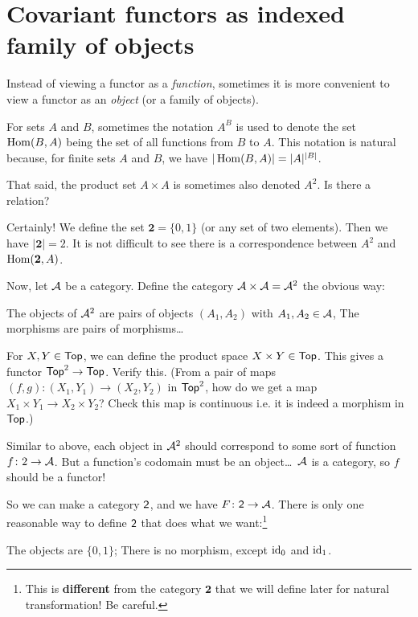 \section{Covariant functors as indexed family of objects}

Instead of viewing a functor as a \emph{function}, sometimes it is more convenient to view a functor
as an \emph{object} (or a family of objects).

For sets $A$ and $B$, sometimes the notation $A^B$ is used to denote the set $\Hom(B, A)$ being the
set of all functions from $B$ to $A$.
This notation is natural because, for finite sets $A$ and $B$, we have $|\Hom(B, A)|=|A|^{|B|}$.

That said, the product set $A \times A$ is sometimes also denoted $A^2$. Is there a relation?

Certainly! We define the set $\textbf{2} = \{ 0, 1 \}$ (or any set of two elements).
Then we have $|\textbf{2}|=2$. It is not difficult to see there is a correspondence between $A^2$
and $\Hom(\textbf{2}, A)$.

Now, let $\AA$ be a category. Define the category $\AA \times \AA = \mathcal
A^2$ the obvious way:
\begin{itemize}
	\ii The objects of $\AA^2$ are pairs of objects $(A_1, A_2)$ with
	$A_1, A_2 \in \AA$,
	\ii The morphisms are pairs of morphisms\dots
\end{itemize}
\begin{exercise}
	For $X, Y \in \catname{Top}$, we can define the product space $X \times Y \in \catname{Top}$.
	This gives a functor $\catname{Top}^2 \to \catname{Top}$. Verify this.
	(From a pair of maps $(f, g): (X_1, Y_1) \to (X_2, Y_2)$ in $\catname{Top}^2$,
	how do we get a map $X_1 \times Y_1 \to X_2 \times Y_2$? Check this map is continuous
	i.e. it is indeed a morphism in $\catname{Top}$.)
\end{exercise}

Similar to above,
each object in $\AA^2$ should correspond to some sort of function
$f \colon 2 \to \AA$.
But a function's codomain must be an object\dots\ $\AA$ is a category,
so $f$ should be a functor!

So we can make a category $\catname{2}$, and we have $F \colon \catname{2}\to \AA$.
There is only one reasonable way to define $\catname{2}$
that does what we want:\footnote{This is \textbf{different} from the category $\textbf{2}$ that we
will define later for natural transformation! Be careful.}
\begin{itemize}
	\ii The objects are $\{ 0, 1 \}$;
	\ii There is no morphism, except $\id_0$ and $\id_1$.
\end{itemize}

